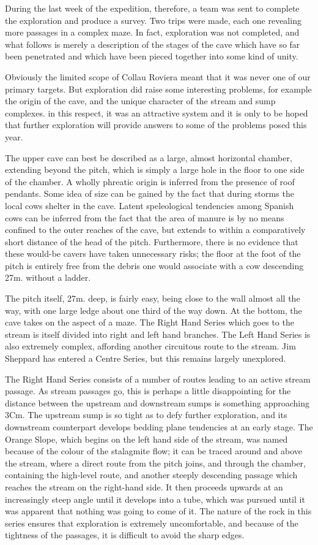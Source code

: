 \documentclass[11pt, a4paper, twoside]{memoir}
\begin{document}
During the last week of the expedition, therefore, a team was sent to complete the exploration and produce a survey. Two trips were made, each one revealing more passages in a complex maze. In fact, exploration was not completed, and what follows is merely a description of the stages of the cave which have so far been penetrated and which have been pieced together into some kind of unity.

Obviously the limited scope of Collau Roviera meant that it was never one of our primary targets. But exploration did raise some interesting problems, for example the origin of the cave, and the unique character of the stream and sump complexes. in this respect, it was an attractive system and it is only to be hoped that further exploration will provide answers to some of the problems posed this year.

The upper cave can best be described as a large, almost horizontal chamber, extending beyond the pitch, which is simply a large hole in the floor to one side of the chamber. A wholly phreatic origin is inferred from the presence of roof pendants. Some idea of size can be gained by the fact that during storms the local cows shelter in the cave. Latent speleological tendencies among Spanish cows can be inferred from the fact that the area of manure is by no means confined to the outer reaches of the cave, but extends to within a comparatively short distance of the head of the pitch. Furthermore, there is no evidence that these would-be cavers have taken unnecessary risks; the floor at the foot of the pitch is entirely free from the debris one would associate with a cow descending 27m. without a ladder.

The pitch itself, 27m. deep, is fairly easy, being close to the wall almost all the way, with one large ledge about one third of the way down. At the bottom, the cave takes on the aspect of a maze. The Right Hand Series which goes to the stream is itself divided into right and left hand branches. The Left Hand Series is also extremely complex, affording another circuitous route to the stream. Jim Sheppard has entered a Centre Series, but this remains largely unexplored.

The Right Hand Series consists of a number of routes leading to an active stream passage. As stream passages go, this is perhaps a little disappointing for the distance between the upstream and downstream sumps is something approaching 3Cm. The upstream sump is so tight as to defy further exploration, and its downstream counterpart develops bedding plane tendencies at an early stage. The Orange Slope, which begins on the left hand side of the stream, was named because of the colour of the stalagmite flow; it can be traced around and above the stream, where a direct route from the pitch joins, and through the chamber, containing the high-level route, and another steeply descending passage which reaches the stream on the right-hand side. It then proceeds upwards at an increasingly steep angle until it develops into a tube, which was pursued until it was apparent that nothing was going to come of it. The nature of the rock in this series ensures that exploration is extremely uncomfortable, and because of the tightness of the passages, it is difficult to avoid the sharp edges.
\end{document}
